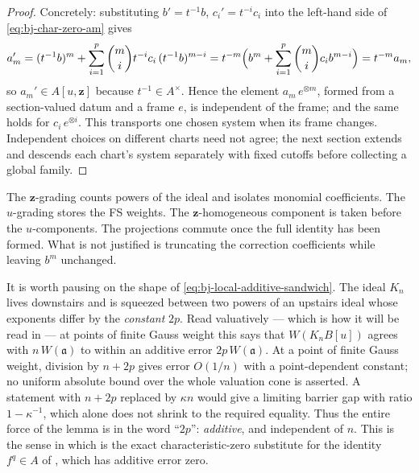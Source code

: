 \begin{proof}
Concretely: substituting $b'=t^{-1}b$, $c_i'=t^{-i}c_i$ into the
left-hand side of \eqref{eq:bj-char-zero-am} gives
\[
 a_m'=(t^{-1}b)^m+\sum_{i=1}^p\binom mi t^{-i}c_i\,(t^{-1}b)^{m-i}
 =t^{-m}\Bigl(b^m+\sum_{i=1}^p\binom mic_ib^{m-i}\Bigr)
 =t^{-m}a_m,
\]
so $a_m'\in A[u,\mathbf z]$ because $t^{-1}\in A^\times$.  Hence the
element $a_m\,e^{\otimes m}$, formed from a section-valued datum and a
frame $e$, is independent of the frame; and the same holds for
$c_i\,e^{\otimes i}$.  This transports one chosen system when its frame changes.
Independent choices on different charts need not agree; the next
section extends and descends each chart's system separately with fixed
cutoffs before collecting a global family.
\end{proof}

\begin{remark}
\label{rem:ch44-two-grading-rule}
The $\mathbf z$-grading counts powers of the ideal and isolates monomial
coefficients.
The $u$-grading stores the FS weights.
The $\mathbf z$-homogeneous component is taken before the $u$-components.
The projections commute once the full identity has been formed.
What is not justified is truncating the correction coefficients while
leaving $b^m$ unchanged.
\end{remark}

\begin{remark}
\label{rem:ch44-sandwich-shape}
It is worth pausing on the shape of \eqref{eq:bj-local-additive-sandwich}.
The ideal $K_n$ lives downstairs and is squeezed between two powers of an
upstairs ideal whose exponents differ by the \emph{constant} $2p$.  Read
valuatively --- which is how it will be read in
 --- at points of finite Gauss weight this says that
$W(K_nB[u])$ agrees with $n\,W(\mathfrak a)$ to within an additive error
$2p\,W(\mathfrak a)$.  At a point of finite Gauss weight, division
by $n+2p$ gives error $O(1/n)$ with a point-dependent constant;
no uniform absolute bound over the whole valuation cone is asserted.  A statement with $n+2p$ replaced by $\kappa n$ would give
a limiting barrier gap with ratio $1-\kappa^{-1}$, which alone
does not shrink to the required equality.  Thus the entire force of the lemma is in the word ``$2p$'':
\emph{additive}, and independent of $n$.  This is the sense in which
 is the exact
characteristic-zero substitute for the identity $f^q\in A$ of
, which has additive error zero.
\end{remark}

